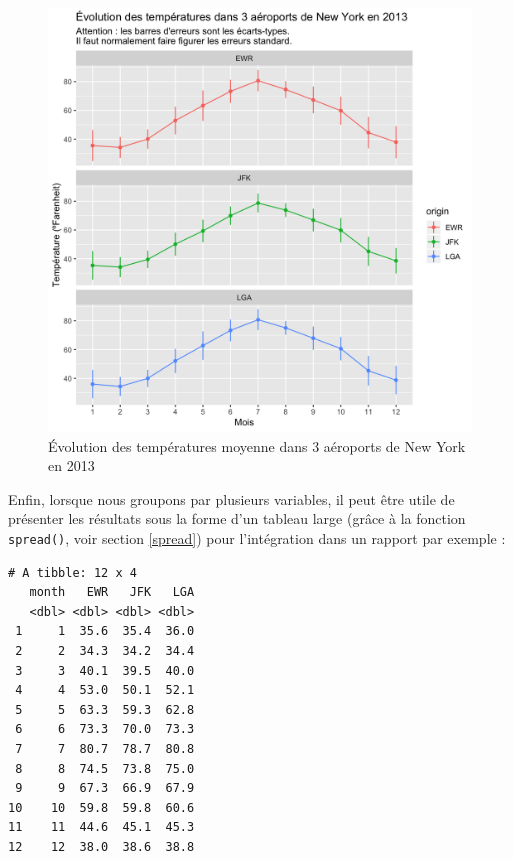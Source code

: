 \documentclass[a4paperpaper,]{article}
\newenvironment{Shaded}{\begin{snugshade}}{\end{snugshade}}
\newcommand{\KeywordTok}[1]{\textcolor[rgb]{0.13,0.29,0.53}{\textbf{#1}}}
\newcommand{\DataTypeTok}[1]{\textcolor[rgb]{0.13,0.29,0.53}{#1}}
\newcommand{\StringTok}[1]{\textcolor[rgb]{0.31,0.60,0.02}{#1}}
\newcommand{\OtherTok}[1]{\textcolor[rgb]{0.56,0.35,0.01}{#1}}
\newcommand{\OperatorTok}[1]{\textcolor[rgb]{0.81,0.36,0.00}{\textbf{#1}}}
\newcommand{\NormalTok}[1]{#1}
\theoremstyle{definition}
\theoremstyle{definition}
\theoremstyle{definition}
\theoremstyle{remark}
\begin{document}
\begin{figure}[htpb]

{\centering \includegraphics[width=0.9\linewidth]{figure/errorbars4-1} 

}

\caption{Évolution des températures moyenne dans 3 aéroports de New York en 2013}\label{fig:errorbars4}
\end{figure}

Enfin, lorsque nous groupons par plusieurs variables, il peut être utile
de présenter les résultats sous la forme d'un tableau large (grâce à la
fonction \texttt{spread()}, voir section \ref{spread}) pour
l'intégration dans un rapport par exemple :

\begin{Shaded}
\end{Shaded}

\begin{verbatim}
# A tibble: 12 x 4
   month   EWR   JFK   LGA
   <dbl> <dbl> <dbl> <dbl>
 1     1  35.6  35.4  36.0
 2     2  34.3  34.2  34.4
 3     3  40.1  39.5  40.0
 4     4  53.0  50.1  52.1
 5     5  63.3  59.3  62.8
 6     6  73.3  70.0  73.3
 7     7  80.7  78.7  80.8
 8     8  74.5  73.8  75.0
 9     9  67.3  66.9  67.9
10    10  59.8  59.8  60.6
11    11  44.6  45.1  45.3
12    12  38.0  38.6  38.8
\end{verbatim}
\end{document}
